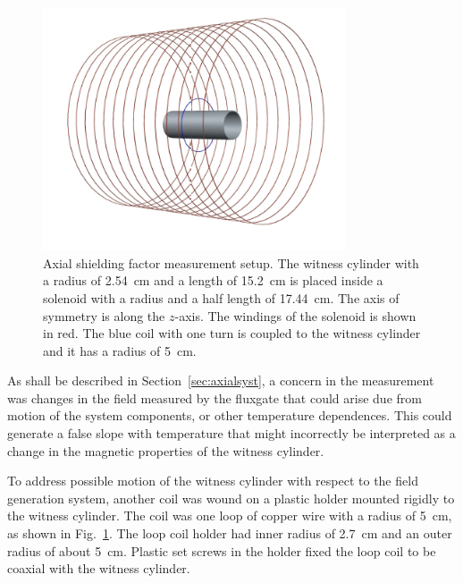 \begin{figure}
\begin{center}
   \includegraphics[width=0.8\textwidth]{geometry.PNG}
    \caption{Axial shielding factor measurement setup. The witness
      cylinder with a radius of 2.54~cm and a length of 15.2~cm is placed
      inside a solenoid with a radius and a half length of
      17.44~cm. The axis of symmetry is along the $z$-axis. The
      windings of the solenoid is shown in red. The blue coil with one
      turn is coupled to the witness cylinder and it has a radius of
      5~cm.  }
    \label{fig:geometry}
    \end{center}
\end{figure}

As shall be described in Section~\ref{sec:axialsyst}, a concern in the
measurement was changes in the field measured by the fluxgate that
could arise due from motion of the system components, or other
temperature dependences.  This could generate a false slope with
temperature that might incorrectly be interpreted as a change in the
magnetic properties of the witness cylinder.

To address possible motion of the witness cylinder with respect to the
field generation system, another coil was wound on a plastic holder
mounted rigidly to the witness cylinder.  The coil was one loop of
copper wire with a radius of 5~cm, as shown in
Fig.~\ref{fig:geometry}. The loop coil holder had inner radius of
2.7~cm and an outer radius of about 5~cm.  Plastic set screws in the
holder fixed the loop coil to be coaxial with the witness cylinder.

